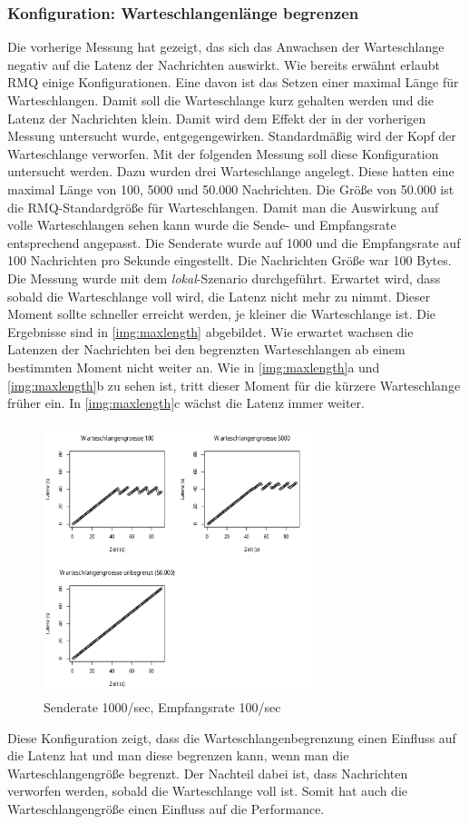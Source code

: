 \subsubsection{Konfiguration: Warteschlangenlänge begrenzen}
\label{sec:maxlength}
Die vorherige Messung hat gezeigt, das sich das Anwachsen der Warteschlange negativ auf die Latenz der Nachrichten auswirkt. Wie bereits erwähnt erlaubt RMQ einige Konfigurationen. Eine davon ist das Setzen einer maximal Länge für Warteschlangen. Damit soll die Warteschlange kurz gehalten werden und die Latenz der Nachrichten klein. Damit wird dem Effekt der in der vorherigen Messung untersucht wurde, entgegengewirken. Standardmäßig wird der Kopf der Warteschlange verworfen. Mit der folgenden Messung soll diese Konfiguration untersucht werden. Dazu wurden drei Warteschlange angelegt. Diese hatten eine maximal Länge von 100, 5000 und 50.000 Nachrichten. Die Größe von 50.000 ist die RMQ-Standardgröße für Warteschlangen. Damit man die Auswirkung auf volle Warteschlangen sehen kann wurde die Sende- und Empfangsrate entsprechend angepasst. Die Senderate wurde auf 1000 und die Empfangsrate auf 100 Nachrichten pro Sekunde eingestellt. Die Nachrichten Größe war 100 Bytes. Die Messung wurde mit dem \textit{lokal}-Szenario durchgeführt. Erwartet wird, dass sobald die Warteschlange voll wird, die Latenz nicht mehr zu nimmt. Dieser Moment sollte schneller erreicht werden, je kleiner die Warteschlange ist.
Die Ergebnisse sind in \autoref{img:maxlength} abgebildet. Wie erwartet wachsen die Latenzen der Nachrichten bei den begrenzten Warteschlangen ab einem bestimmten Moment nicht weiter an. Wie in \autoref{img:maxlength}a und \autoref{img:maxlength}b zu sehen ist, tritt dieser Moment für die kürzere Warteschlange früher ein. In \autoref{img:maxlength}c wächst die Latenz immer weiter.
\begin{figure}
\center
  \includegraphics[width=0.7\textwidth]{images/measurement/max-length.pdf}
  \caption{Senderate 1000/sec, Empfangsrate 100/sec}
  \label{img:maxlength}
\end{figure}
Diese Konfiguration zeigt, dass die Warteschlangenbegrenzung einen Einfluss auf die Latenz hat und man diese begrenzen kann, wenn man die Warteschlangengröße begrenzt. Der Nachteil dabei ist, dass Nachrichten verworfen werden, sobald die Warteschlange voll ist. Somit hat auch die Warteschlangengröße einen Einfluss auf die Performance. 

